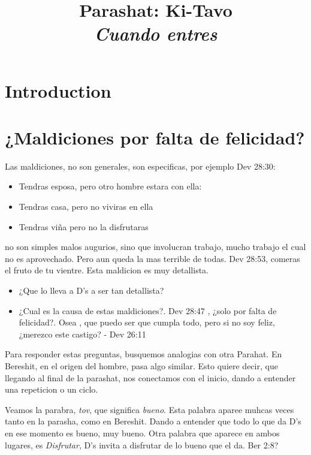 \documentclass[conference]{IEEEtran}
\title{Parashat: Ki-Tavo \\ \textit{Cuando entres}}
\author{\IEEEauthorblockN{Kunst, James Jules Waldemar}
\IEEEauthorblockA{Bet-Melej Haba}}
\begin{document}
\maketitle


\section{Introduction}



\section{¿Maldiciones por falta de felicidad?}

Las maldiciones, no son generales, son especificas, por ejemplo Dev 28:30:
\begin{itemize}
\item Tendras esposa, pero otro hombre estara con ella: 
\item Tendras casa, pero no viviras en ella 
\item Tendras viña pero no la disfrutaras
\end{itemize}

no son simples malos augurios, sino que involucran trabajo, mucho trabajo el cual no es aprovechado.
Pero aun queda la mas terrible de todas. Dev 28:53, comeras el fruto de tu vientre. Esta maldicion es muy detallista.

\begin{itemize}
\item
¿Que lo lleva a D's a ser tan detallista?
\item 
¿Cual es la causa de estas maldiciones?. Dev 28:47 , ¿solo por falta de felicidad?. Osea , que puedo ser que cumpla todo, pero si no soy feliz, ¿merezco este castigo? - Dev 26:11
\end{itemize}


Para responder estas preguntas, busquemos analogias con otra Parahat. En Bereshit, en el origen del hombre, pasa algo similar.
Esto quiere decir, que llegando al final de la parashat, nos conectamos con el inicio, dando a entender una repeticion o un ciclo.

Veamos la parabra, \textit{tov}, que significa \textit{bueno}. Esta palabra aparee muhcas veces tanto en la parasha, como en Bereshit. Dando a entender que todo lo que da D's en ese momento es bueno, muy bueno.
Otra palabra que aparece en ambos lugares, es \textit{Disfrutar}, D's invita a disfrutar de lo bueno que el da. Ber 2:8? 
\end{document}
